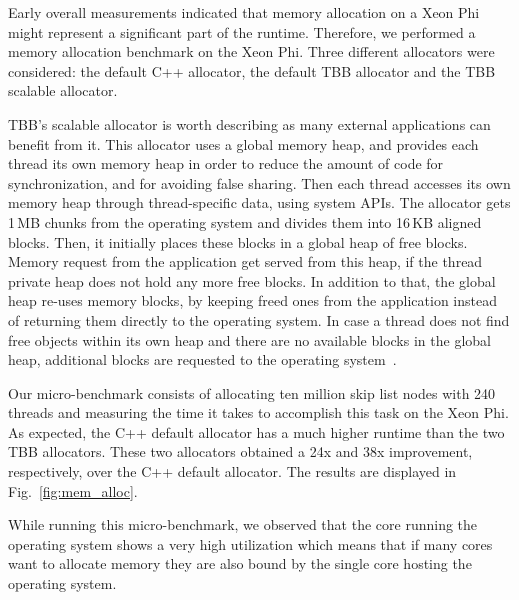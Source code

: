 Early overall measurements indicated that memory allocation on a Xeon Phi might represent a significant part of the runtime.
Therefore, we performed a memory allocation benchmark on the Xeon Phi.
Three different allocators were considered: the default C++ allocator, the default TBB allocator and the TBB scalable allocator. 

TBB's scalable allocator is worth describing as many external applications can benefit from it.
This allocator uses a global memory heap, and provides each thread its own memory heap in order to reduce the amount of code for synchronization, and for avoiding false sharing. Then each thread accesses its own memory heap through thread-specific data, using system APIs. The allocator gets 1\,MB chunks from the operating system and divides them into 16\,KB aligned blocks. Then, it initially places these blocks in a global heap of free blocks. Memory request from the application get served from this heap, if the thread private heap does not hold any more free blocks.
In addition to that, the global heap re-uses memory blocks, by keeping freed ones from the application instead of returning them directly to the operating system.
In case a thread does not find free objects within its own heap and there are no available blocks in the global heap, additional blocks are requested to the operating system~\cite{_thefoundations,Hudson:2006:MST:1133956.1133967}. 

Our micro-benchmark consists of allocating ten million skip list nodes with 240 threads and measuring the time it takes to accomplish this task on the Xeon Phi.
As expected, the C++ default allocator has a much higher runtime than the two TBB allocators. These two allocators obtained a 24x and 38x improvement, respectively, over the C++ default allocator. The results are displayed in Fig.~\ref{fig:mem_alloc}.

While running this micro-benchmark, we observed that the core running the operating system shows a very high utilization which means that if many cores want to allocate memory they are also bound by the single core hosting the operating system.

